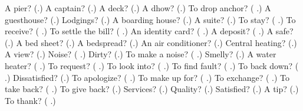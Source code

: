 \begin{tcolorbox}[breakable,colback=teal!4,colframe=teal!35!black,title={Before you move on}]
A pier? (\textbf{}.) A captain? (\textbf{}.) A deck? (\textbf{}.) A dhow? (\textbf{}.) To drop anchor? (\textbf{ }.) A guesthouse? (\textbf{}.) Lodgings? (\textbf{}.) A boarding house? (\textbf{}.) A suite? (\textbf{}.) To stay? (\textbf{ }.) To receive? (\textbf{ }.) To settle the bill? (\textbf{  }.) An identity card? (\textbf{ }.) A deposit? (\textbf{ }.) A safe? (\textbf{}.) A bed sheet? (\textbf{}.) A bedspread? (\textbf{}.) An air conditioner? (\textbf{}.) Central heating? (\textbf{}.) A view? (\textbf{}.) Noise? (\textbf{  }.) Dirty? (\textbf{}.) To make a noise? (\textbf{ }.) Smelly? (\textbf{}.) A water heater? (\textbf{ }.) To request? (\textbf{ }.) To look into? (\textbf{ }.) To find fault? (\textbf{ }.) To back down? (\textbf{ }.) Dissatisfied? (\textbf{}.) To apologize? (\textbf{ }.) To make up for? (\textbf{ }.) To exchange? (\textbf{ }.) To take back? (\textbf{ }.) To give back? (\textbf{}.) Services? (\textbf{}.) Quality? (\textbf{}.) Satisfied? (\textbf{}.) A tip? (\textbf{}.) To thank? (\textbf{ }.)
\end{tcolorbox}
